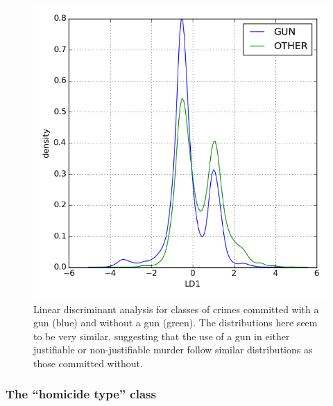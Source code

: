 \begin{multicols}{2}
\begin{figure}[H]
  \centering
    \includegraphics[width=\linewidth]{images/gun/gun.png}
  \caption{Linear discriminant analysis for classes of crimes committed with a gun (blue) and without a gun (green).  The distributions here seem to be very similar, suggesting that the use of a gun in either justifiable or non-justifiable murder follow similar distributions as those committed without.}
\end{figure}

\subsubsection{The ``homicide type'' class}


\end{multicols}
